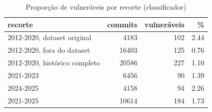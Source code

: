 \begin{table}[htbp]
\centering
\caption{Proporção de vulneráveis por recorte (classificador)}
\label{tab:periodos}
\begin{tabular}{lrrr}
\toprule
recorte & commits & vulneráveis & \% \\
\midrule
2012-2020, dataset original & 4183 & 102 & 2.44 \\
2012-2020, fora do dataset & 16403 & 125 & 0.76 \\
2012-2020, histórico completo & 20586 & 227 & 1.10 \\
2021-2023 & 6456 & 90 & 1.39 \\
2024-2025 & 4158 & 94 & 2.26 \\
2021-2025 & 10614 & 184 & 1.73 \\
\bottomrule
\end{tabular}
\end{table}
